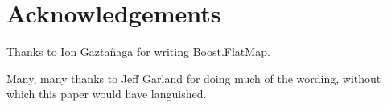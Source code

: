 \section{Acknowledgements}

Thanks to Ion Gazta\~{n}aga for writing Boost.FlatMap.

Many, many thanks to Jeff Garland for doing much of the wording, without which
this paper would have languished.
